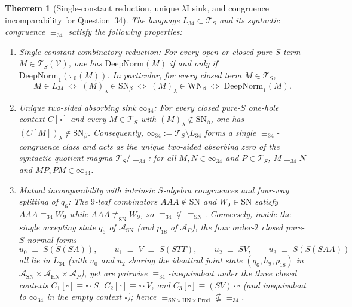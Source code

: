 \documentclass[11pt,reqno]{amsart}
\numberwithin{equation}{section}
\theoremstyle{plain}
\newtheorem{theorem}{Theorem}[section]
\theoremstyle{definition}
\theoremstyle{remark}
\newcommand{\TS}{\mathcal{T}_S}
\newcommand{\TSV}{\mathcal{T}_S(\mathcal{V})}
\newcommand{\SN}{\mathrm{SN}}
\newcommand{\WN}{\mathrm{WN}}
\newcommand{\HN}{\mathrm{HN}}
\newcommand{\Prod}{\mathrm{Prod}}
\begin{document}
\begin{theorem}[Single-constant reduction, unique $\lambda\mathrm{I}$ sink, and congruence incomparability for Question~34]\label{thm:question-34-structure}
The language $L_{34} \subset \TS$ and its syntactic congruence $\equiv_{34}$ satisfy the following properties:
\begin{enumerate}[label=(\roman*),leftmargin=2.2em]
  \item \emph{Single-constant combinatory reduction:} For every open or closed pure-$S$ term $M \in \TSV$, one has $\mathrm{DeepNorm}(M)$ if and only if $\mathrm{DeepNorm}_1(\pi_0(M))$. In particular, for every closed term $M \in \TS$,
  \[
    M \in L_{34} \;\iff\; (M)_\lambda \in \SN_\beta \;\iff\; (M)_\lambda \in \WN_\beta \;\iff\; \mathrm{DeepNorm}_1(M).
  \]
  \item \emph{Unique two-sided absorbing sink $\infty_{34}$:} For every closed pure-$S$ one-hole context $C[\square]$ and every $M \in \TS$ with $(M)_\lambda \notin \SN_\beta$, one has $(C[M])_\lambda \notin \SN_\beta$. Consequently, $\infty_{34} := \TS \setminus L_{34}$ forms a single $\equiv_{34}$-congruence class and acts as the unique two-sided absorbing zero of the syntactic quotient magma $\TS / {\equiv_{34}}$: for all $M, N \in \infty_{34}$ and $P \in \TS$, $M \equiv_{34} N$ and $M P, P M \in \infty_{34}$.
  \item \emph{Mutual incomparability with intrinsic $S$-algebra congruences and four-way splitting of $q_6$:} The $9$-leaf combinators $A A A \notin \SN$ and $W_9 \in \SN$ satisfy $A A A \equiv_{34} W_9$ while $A A A \not\equiv_{\SN} W_9$, so ${\equiv_{34}} \not\subseteq {\equiv_{\SN}}$. Conversely, inside the single accepting state $q_6$ of $\mathcal{A}_{\SN}$ (and $p_{18}$ of $\mathcal{A}_P$), the four order-$2$ closed pure-$S$ normal forms
  \begin{equation}\label{eq:q34-u0123}
    u_0 \;\equiv\; S(S(S A)), \qquad u_1 \;\equiv\; V \;\equiv\; S(S T T), \qquad u_2 \;\equiv\; S V, \qquad u_3 \;\equiv\; S(S(S A A))
  \end{equation}
  all lie in $L_{34}$ (with $u_0$ and $u_2$ sharing the identical joint state $(q_6, h_9, p_{18})$ in $\mathcal{A}_{\SN} \times \mathcal{A}_{\HN} \times \mathcal{A}_P$), yet are pairwise $\equiv_{34}$-inequivalent under the three closed contexts $C_1[\square] \equiv \square \cdot S$, $C_2[\square] \equiv \square \cdot V$, and $C_3[\square] \equiv (S V) \cdot \square$ (and inequivalent to $\infty_{34}$ in the empty context $\square$); hence ${\equiv_{\SN \times \HN \times \Prod}} \not\subseteq {\equiv_{34}}$.
\end{enumerate}
\end{theorem}
\end{document}
